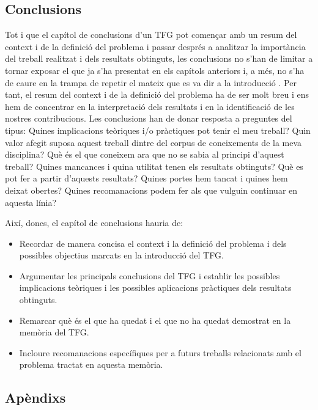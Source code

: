 \subsection{Conclusions}

Tot i que el capítol de conclusions d'un \ac{TFG} pot començar amb un resum del context i de la definició del problema i passar després a analitzar la importància del treball realitzat i dels resultats obtinguts, les conclusions no s'han de limitar a tornar exposar el que ja s'ha presentat en els capítols anteriors i, a més, no s'ha de caure en la trampa de repetir el mateix que es va dir a la introducció \cite{Pierson97}. Per tant, el resum del context i de la definició del problema ha de ser molt breu i ens hem de concentrar en la interpretació dels resultats i en la identificació de les nostres contribucions. Les conclusions han de donar resposta a preguntes del tipus: Quines implicacions teòriques i/o pràctiques pot tenir el meu treball? Quin valor afegit suposa aquest treball dintre del corpus de coneixements de la meva disciplina? Què és el que coneixem ara que no se sabia al principi d'aquest treball? Quines mancances i quina utilitat tenen els resultats obtinguts? Què es pot fer a partir d'aquests resultats? Quines portes hem tancat i quines hem deixat obertes? Quines recomanacions podem fer als que vulguin continuar en aquesta línia?

Així, doncs, el capítol de conclusions hauria de:
\begin{itemize}\tightlist
   \item Recordar de manera concisa el context i la definició del problema i dels possibles objectius marcats en la introducció del \ac{TFG}.

   \item Argumentar les principals conclusions del \ac{TFG} i establir les possibles implicacions teòriques i les possibles aplicacions pràctiques dels resultats obtinguts.

   \item Remarcar què és el que ha quedat i el que no ha quedat demostrat en la memòria del \ac{TFG}.

   \item Incloure recomanacions específiques per a futurs treballs relacionats amb el problema tractat en aquesta memòria.
\end{itemize}


\subsection{Apèndixs}

